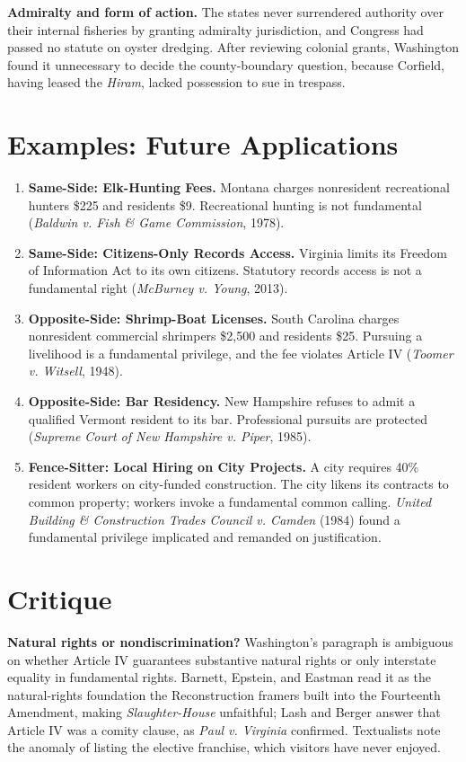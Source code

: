 \documentclass[12pt]{article}
\begin{document}
\textbf{Admiralty and form of action.} The states never surrendered authority over their internal fisheries by granting admiralty jurisdiction, and Congress had passed no statute on oyster dredging. After reviewing colonial grants, Washington found it unnecessary to decide the county-boundary question, because Corfield, having leased the \textit{Hiram}, lacked possession to sue in trespass.

\section{Examples: Future Applications}

\begin{enumerate}
\item \textbf{Same-Side: Elk-Hunting Fees.} Montana charges nonresident recreational hunters \$225 and residents \$9. Recreational hunting is not fundamental (\textit{Baldwin v. Fish \& Game Commission}, 1978).
\item \textbf{Same-Side: Citizens-Only Records Access.} Virginia limits its Freedom of Information Act to its own citizens. Statutory records access is not a fundamental right (\textit{McBurney v. Young}, 2013).
\item \textbf{Opposite-Side: Shrimp-Boat Licenses.} South Carolina charges nonresident commercial shrimpers \$2,500 and residents \$25. Pursuing a livelihood is a fundamental privilege, and the fee violates Article IV (\textit{Toomer v. Witsell}, 1948).
\item \textbf{Opposite-Side: Bar Residency.} New Hampshire refuses to admit a qualified Vermont resident to its bar. Professional pursuits are protected (\textit{Supreme Court of New Hampshire v. Piper}, 1985).
\item \textbf{Fence-Sitter: Local Hiring on City Projects.} A city requires 40\% resident workers on city-funded construction. The city likens its contracts to common property; workers invoke a fundamental common calling. \textit{United Building \& Construction Trades Council v. Camden} (1984) found a fundamental privilege implicated and remanded on justification.
\end{enumerate}

\section{Critique}

\textbf{Natural rights or nondiscrimination?} Washington's paragraph is ambiguous on whether Article IV guarantees substantive natural rights or only interstate equality in fundamental rights. Barnett, Epstein, and Eastman read it as the natural-rights foundation the Reconstruction framers built into the Fourteenth Amendment, making \textit{Slaughter-House} unfaithful; Lash and Berger answer that Article IV was a comity clause, as \textit{Paul v. Virginia} confirmed. Textualists note the anomaly of listing the elective franchise, which visitors have never enjoyed.
\end{document}
